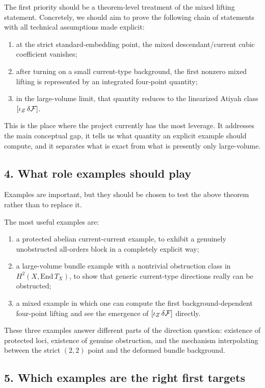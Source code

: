 \documentclass[11pt]{article}
\begin{document}
The first priority should be a theorem-level treatment of the mixed lifting statement. Concretely, we should aim to prove the following chain of statements with all technical assumptions made explicit:
\begin{enumerate}
\item at the strict standard-embedding point, the mixed descendant/current cubic coefficient vanishes;
\item after turning on a small current-type background, the first nonzero mixed lifting is represented by an integrated four-point quantity;
\item in the large-volume limit, that quantity reduces to the linearized Atiyah class $[\iota_Z\,\delta{\cal F}]$.
\end{enumerate}

This is the place where the project currently has the most leverage. It addresses the main conceptual gap, it tells us what quantity an explicit example should compute, and it separates what is exact from what is presently only large-volume.

\subsection*{4. What role examples should play}

Examples are important, but they should be chosen to test the above theorem rather than to replace it.

The most useful examples are:
\begin{enumerate}
\item a protected abelian current-current example, to exhibit a genuinely unobstructed all-orders block in a completely explicit way;
\item a large-volume bundle example with a nontrivial obstruction class in $H^2(X,\mathrm{End}\,T_X)$, to show that generic current-type directions really can be obstructed;
\item a mixed example in which one can compute the first background-dependent four-point lifting and see the emergence of $[\iota_Z\,\delta{\cal F}]$ directly.
\end{enumerate}

These three examples answer different parts of the direction question: existence of protected loci, existence of genuine obstruction, and the mechanism interpolating between the strict $(2,2)$ point and the deformed bundle background.

\subsection*{5. Which examples are the right first targets}
\end{document}
